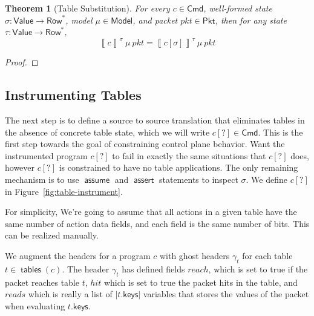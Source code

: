 \documentclass{article}
\newcommand{\pkt}{\mathit{pkt}}
\newcommand{\denote}[1]{\left\llbracket#1\right\rrbracket}
\newcommand{\Value}{\mathsf{Value}}
\newcommand{\Cmd}{\mathsf{Cmd}}
\newcommand{\Pkt}{\mathsf{Pkt}}
\newcommand{\Model}{\mathsf{Model}}
\newcommand{\Row}{\mathsf{Row}}
\newcommand{\keys}{\mathsf{keys}}
\newcommand{\reach}{\mathit{\mathit{reach}}}
\newcommand{\hit}{\mathit{hit}}
\newcommand{\reads}{\mathit{reads}}
\newcommand{\assert}{\mathop{\mathsf{assert}}}
\newcommand{\assume}{\mathop{\mathsf{assume}}}
\newcommand{\instr}{[?]}
\newcommand{\tables}{\mathop{\mathsf{tables}}}
\newtheorem{theorem}{Theorem}
\begin{document}
\begin{theorem}[Table Substitution]
  For every $c \in \Cmd$, well-formed state $\sigma : \Value \to \Row^*$, model
  $\mu \in \Model$, and packet $\pkt \in \Pkt$, then for any state $\tau :
  \Value \to \Row^*$,
  \[\denote{c}^\sigma~\mu~\pkt = \denote{c[\sigma]}^\tau~\mu~\pkt\]
\end{theorem}
\begin{proof}
\end{proof}


\subsection{Instrumenting Tables}

The next step is to define a source to source translation that eliminates tables
in the absence of concrete table state, which we will write $c\instr \in \Cmd$.
This is the first step towards the goal of constraining control plane behavior.
Want the instrumented program $c\instr$ to fail in exactly the same situations that
$c\instr$ does, however $c\instr$ is constrained to have no table applications.
The only remaining mechanism is to use $\assume$ and $\assert$ statements to
inspect $\sigma$. We define $c[?]$ in Figure~\ref{fig:table-instrument}.

For simplicity, We're going to assume that all actions in a given table have the
same number of action data fields, and each field is the same number of bits.
This can be realized manually.

We augment the headers for a program $c$ with ghost headers $\gamma_t$ for each
table $t \in \tables(c)$. The header $\gamma_t$ has defined fields
$\reach$, which is set to true if the packet reaches table $t$,
$\hit$ which is set to true the packet hits in the table, and
$\reads$ which is really a list of $|t.\keys|$ variables that stores the
values of the packet when evaluating $t.\keys$.
\end{document}
